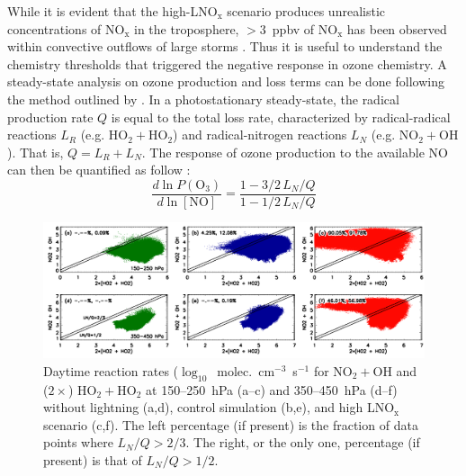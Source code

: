 While it is evident that the high-LNO$_\mathrm{x}$ scenario produces unrealistic
concentrations of NO$_\mathrm{x}$ in the troposphere, $>3$~ppbv of
NO$_\mathrm{x}$ has been observed within convective outflows of large
storms \citep[e.g.][]{Stith:1999fk,Ridley:2004oa,Ott:2007hs,Cummings:2013vn}. Thus it is useful to understand the
chemistry thresholds that triggered the negative response in ozone chemistry.
A steady-state analysis on ozone production and loss terms can be done
following the method outlined by \citet{Kleinman:1997vn}. In a photostationary steady-state, the radical
production rate $Q$ is equal to the total loss rate, characterized by radical-radical
reactions $L_R$ (e.g. $\mathrm{HO_2+HO_2}$) and radical-nitrogen reactions
$L_N$ (e.g. $\mathrm{NO_2+OH}$). That is, $Q=L_R+L_N$. The response of
ozone production to the available NO can then be quantified as follow
\citep{Kleinman:1997vn}:
\begin{equation}\label{eqn:kleinman}
\frac{d\ln P(\mathrm{O_3})}{d\ln[\mathrm{NO}]} =
\frac{1-3/2\,L_N/Q}{1-1/2\,L_N/Q}
\end{equation}

 \begin{figure}
 \noindent\includegraphics[width=40pc]{Figures/rxn.png}
 \caption[Daytime reaction rates]{Daytime reaction rates ($\log_{10}$~molec.~cm$^{-3}$~s$^{-1}$
for NO$_2+$OH and ($2\times$) HO$_2+$HO$_2$ at 150--250~hPa (a--c)
and 350--450~hPa (d--f) without lightning (a,d), control simulation (b,e),
and high LNO$_{\mathrm{x}}$ scenario (c,f). The left percentage (if present) is the fraction
of data points where $L_N/Q>2/3$. The right, or the only one, percentage (if present) is that
of $L_N/Q>1/2$.}
 \label{fig:ltng_rxn}
 \end{figure}

